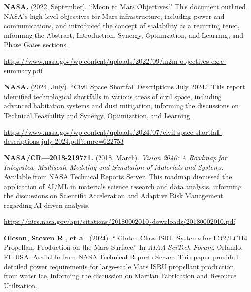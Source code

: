 \documentclass[fontsize=10pt, oneside, DIV=calc]{scrartcl}
\begin{document}
\vspace{1em}
\noindent \textbf{NASA.} (2022, September). ``Moon to Mars Objectives.'' This document outlined NASA's high-level objectives for Mars infrastructure, including power and communications, and introduced the concept of scalability as a recurring tenet, informing the Abstract, Introduction, Synergy, Optimization, and Learning, and Phase Gates sections. 



\href{https://www.nasa.gov/wp-content/uploads/2022/09/m2m-objectives-exec-summary.pdf}{\url{https://www.nasa.gov/wp-content/uploads/2022/09/m2m-objectives-exec-summary.pdf}}

\vspace{1em}
\noindent \textbf{NASA.} (2024, July). ``Civil Space Shortfall Descriptions July 2024.'' This report identified technological shortfalls in various areas of civil space, including advanced habitation systems and dust mitigation, informing the discussions on Technical Feasibility and Synergy, Optimization, and Learning. 



\href{https://www.nasa.gov/wp-content/uploads/2024/07/civil-space-shortfall-descriptions-july-2024.pdf?emrc=622753}{\url{https://www.nasa.gov/wp-content/uploads/2024/07/civil-space-shortfall-descriptions-july-2024.pdf?emrc=622753}}

\vspace{1em}
\noindent \textbf{NASA/CR—2018-219771.} (2018, March). \textit{Vision 2040: A Roadmap for Integrated, Multiscale Modeling and Simulation of Materials and Systems}. Available from NASA Technical Reports Server. This roadmap discussed the application of AI/ML in materials science research and data analysis, informing the discussions on Scientific Acceleration and Adaptive Risk Management regarding AI-driven analysis. 



\href{https://ntrs.nasa.gov/api/citations/20180002010/downloads/20180002010.pdf}{\url{https://ntrs.nasa.gov/api/citations/20180002010/downloads/20180002010.pdf}}

\vspace{1em}
\noindent \textbf{Oleson, Steven R., et al.} (2024). ``Kiloton Class ISRU Systems for LO2/LCH4 Propellant Production on the Mars Surface.'' In \textit{AIAA SciTech Forum}, Orlando, FL USA. Available from NASA Technical Reports Server. This paper provided detailed power requirements for large-scale Mars ISRU propellant production from water ice, informing the discussion on Martian Fabrication and Resource Utilization. 
\end{document}
